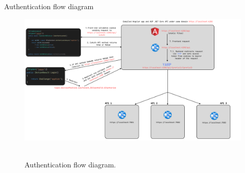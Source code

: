 Authentication flow diagram
\begin{figure}[H]
    \centering
    \includegraphics[width=1\textwidth]{img/Auth_flow_updated}
    ~\caption{Authentication flow diagram.}\label{fig:authentication_flow_diagram}
\end{figure}